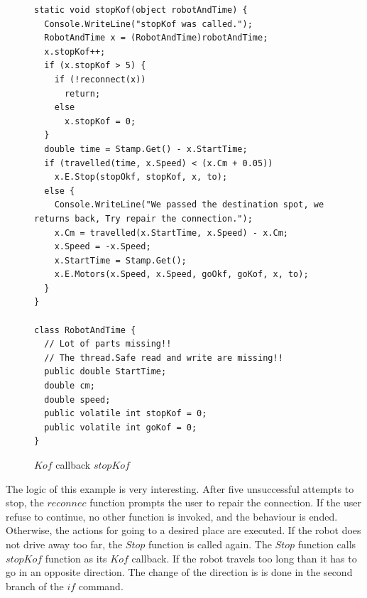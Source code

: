 \begin{figure}[!hbp]
\begin{lstlisting}
static void stopKof(object robotAndTime) {
  Console.WriteLine("stopKof was called.");
  RobotAndTime x = (RobotAndTime)robotAndTime;
  x.stopKof++;
  if (x.stopKof > 5) {
    if (!reconnect(x))
      return;
    else
      x.stopKof = 0;
  }
  double time = Stamp.Get() - x.StartTime;
  if (travelled(time, x.Speed) < (x.Cm + 0.05))
    x.E.Stop(stopOkf, stopKof, x, to);
  else {
    Console.WriteLine("We passed the destination spot, we returns back, Try repair the connection.");
    x.Cm = travelled(x.StartTime, x.Speed) - x.Cm;
    x.Speed = -x.Speed;
    x.StartTime = Stamp.Get();
    x.E.Motors(x.Speed, x.Speed, goOkf, goKof, x, to);
  }
}

class RobotAndTime {
  // Lot of parts missing!! 
  // The thread.Safe read and write are missing!!
  public double StartTime;
  double cm;
  double speed;
  public volatile int stopKof = 0;
  public volatile int goKof = 0;
}
\end{lstlisting}
\caption{$Kof$ callback $stopKof$} \label{stopKof}
\end{figure}
  The logic of this example is very interesting. After five unsuccessful attempts to stop, the $reconnec$ function
  prompts the user to repair the connection. 
  If the user refuse to continue, no other function is invoked, and the behaviour is ended.
  Otherwise, the actions for going to a desired place are executed.
  If the robot does not drive away too far, the $Stop$ function is called again.
  The $Stop$ function calls $stopKof$ function as its $Kof$ callback.
  If the robot travels too long than it has to go in an opposite direction.
  The change of the direction is is done in the second branch of the $if$ command.


